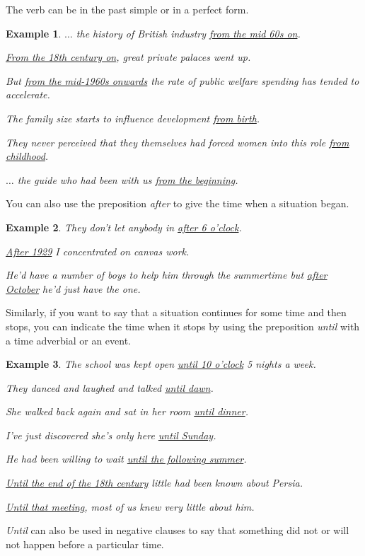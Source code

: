 \documentclass[oneside]{book}
\numberwithin{equation}{section}
\newtheorem{example}{Example}[section]
\begin{document}
The verb can be in the past simple or in a perfect form.
\begin{example}
    $\ldots$ the history of British industry \underline{from the mid 60s on}.
    
    \underline{From the 18th century on}, great private palaces went up.
    
    But \underline{from the mid-1960s onwards} the rate of public welfare spending has tended to accelerate.
    
    The family size starts to influence development \underline{from birth}.
    
    They never perceived that they themselves had forced women into this role \underline{from childhood}.
    
    $\ldots$ the guide who had been with us \underline{from the beginning}.
\end{example}
%
\noindent{} You can also use the preposition \textit{after} to give the time when a situation began.
\begin{example}
    They don't let anybody in \underline{after 6 o'clock}.
    
    \underline{After 1929} I concentrated on canvas work.
    
    He'd have a number of boys to help him through the summertime but \underline{after October} he'd just have the one.
\end{example}
%
\noindent{} Similarly, if you want to say that a situation continues for some time and then stops, you can indicate the time when it stops by using the preposition \textit{until} with a time adverbial or an event.
\begin{example}
    The school was kept open \underline{until 10 o'clock} 5 nights a week.
    
    They danced and laughed and talked \underline{until dawn}.
    
    She walked back again and sat in her room \underline{until dinner}.
    
    I've just discovered she's only here \underline{until Sunday}.
    
    He had been willing to wait \underline{until the following summer}.
    
    \underline{Until the end of the 18th century} little had been known about Persia.
    
    \underline{Until that meeting}, most of us knew very little about him.
\end{example}
\textit{Until} can also be used in negative clauses to say that something did not or will not happen before a particular time.
\end{document}
